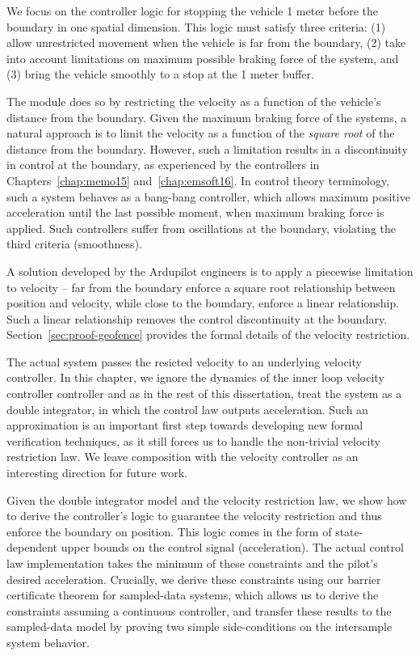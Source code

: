 We focus on the controller logic for stopping the vehicle 1 meter before
the boundary in one spatial dimension. This logic must satisfy three
criteria: (1) allow unrestricted movement when the vehicle is far from the
boundary, (2) take into account limitations on maximum possible braking
force of the system, and (3) bring the vehicle smoothly to a stop at the 1
meter buffer.

The module does so by restricting the velocity as a function of the
vehicle's distance from the boundary. Given the maximum braking force of
the systems, a natural approach is to limit the velocity as a function of
the \emph{square root} of the distance from the boundary. However, such a
limitation results in a discontinuity in control at the boundary, as
experienced by the controllers in Chapters~\ref{chap:memo15}
and~\ref{chap:emsoft16}. In control theory terminology, such a system
behaves as a bang-bang controller, which allows maximum positive
acceleration until the last possible moment, when maximum braking force is
applied. Such controllers suffer from oscillations at the boundary,
violating the third criteria (smoothness).

A solution developed by the Ardupilot engineers is to apply a piecewise
limitation to velocity -- far from the boundary enforce a square root
relationship between position and velocity, while close to the boundary,
enforce a linear relationship. Such a linear relationship removes the
control discontinuity at the boundary. Section~\ref{sec:proof-geofence}
provides the formal details of the velocity restriction.

The actual system passes the resicted velocity to an underlying velocity
controller. In this chapter, we ignore the dynamics of the inner loop
velocity controller controller and as in the rest of this dissertation,
treat the system as a double integrator, in which the control law outputs
acceleration. Such an approximation is an important first step towards
developing new formal verification techniques, as it still forces us to
handle the non-trivial velocity restriction law.  We leave composition with
the velocity controller as an interesting direction for future work.

Given the double integrator model and the velocity restriction law, we show
how to derive the controller's logic to guarantee the velocity restriction
and thus enforce the boundary on position. This logic comes in the form of
state-dependent upper bounds on the control signal (acceleration). The
actual control law implementation takes the minimum of these constraints
and the pilot's desired acceleration. Crucially, we derive these
constraints using our barrier certificate theorem for sampled-data systems,
which allows us to derive the constraints assuming a continuous controller,
and transfer these results to the sampled-data model by proving two simple
side-conditions on the intersample system behavior.

